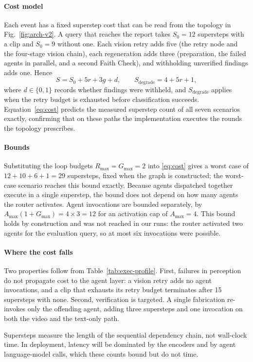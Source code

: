 \paragraph{Cost model}
Each event has a fixed superstep cost that can be read from the topology in
Fig.~\ref{fig:arch-v2}. A query that reaches the report takes $S_0 = 12$
supersteps with a clip and $S_0 = 9$ without one. Each vision retry adds five
(the retry node and the four-stage vision chain), each regeneration adds three
(preparation, the failed agents in parallel, and a second Faith Check), and
withholding unverified findings adds one. Hence
\begin{equation}
  S = S_0 + 5r + 3g + d, \qquad S_{\text{degrade}} = 4 + 5r + 1,
  \label{eq:cost}
\end{equation}
where $d \in \{0,1\}$ records whether findings were withheld, and
$S_{\text{degrade}}$ applies when the retry budget is exhausted before
classification succeeds. Equation~\eqref{eq:cost} predicts the measured
superstep count of all seven scenarios exactly, confirming that on these paths
the implementation executes the rounds the topology prescribes.

\paragraph{Bounds}
Substituting the loop budgets $R_{\max} = G_{\max} = 2$ into \eqref{eq:cost}
gives a worst case of $12 + 10 + 6 + 1 = 29$ supersteps, fixed when the graph
is constructed; the worst-case scenario reaches this bound exactly. Because
agents dispatched together execute in a single superstep, the bound does not
depend on how many agents the router activates. Agent invocations are bounded
separately, by $A_{\max}(1 + G_{\max}) = 4 \times 3 = 12$ for an activation cap
of $A_{\max} = 4$. This bound holds by construction and was not reached in our
runs: the router activated two agents for the evaluation query, so at most six
invocations were possible.

\paragraph{Where the cost falls}
Two properties follow from Table~\ref{tab:exec-profile}. First, failures in
perception do not propagate cost to the agent layer: a vision retry adds no
agent invocations, and a clip that exhausts its retry budget terminates after
15 supersteps with none. Second, verification is targeted. A single
fabrication re-invokes only the offending agent, adding three supersteps and
one invocation on both the video and the text-only path.

Supersteps measure the length of the sequential dependency chain, not
wall-clock time. In deployment, latency will be dominated by the encoders and
by agent language-model calls, which these counts bound but do not time.

